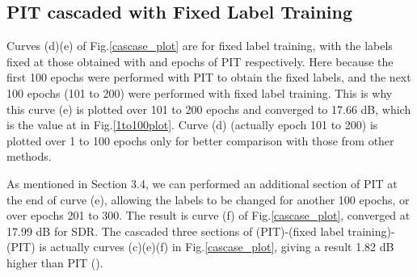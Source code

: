 \documentclass{article}
\begin{document}
\begin{figure*}[t]
    \vspace{-10pt}
    \centering
    \captionsetup{justification=centering}
    \caption{\small SDR scores on the validation set at each epoch for different training approaches:\\ (a)(b)(d)(e) fixed labels, (c)(f) dynamic labels (PIT), (e)(f) cascaded 2 and 3 sections.}
    \vspace{-7pt}
    \label{cascase_plot}
\end{figure*}


\subsection{PIT cascaded with Fixed Label Training }
\vspace{-7pt}
Curves (d)(e) of Fig.\ref{cascase_plot} are for fixed label training, with the labels fixed at those obtained with  and  epochs of PIT respectively. Here because the first 100 epochs were performed with PIT to obtain the fixed labels, and the next 100 epochs (101 to 200) were performed with fixed label training. This is why this curve (e) is plotted over 101 to 200 epochs and converged to 17.66 dB, which is the value at  in Fig.\ref{1to100plot}. Curve (d) (actually epoch 101 to 200) is plotted over 1 to 100 epochs only for better comparison with those from other methods. 



As mentioned in Section 3.4, we can performed an additional section of PIT at the end of curve (e), allowing the labels to be changed for another 100 epochs, or over epochs 201 to 300. The result is curve (f) of Fig.\ref{cascase_plot}, converged at 17.99 dB for SDR. The cascaded three sections of (PIT)-(fixed label training)-(PIT) is actually curves (c)(e)(f) in Fig.\ref{cascase_plot}, giving a result 1.82 dB higher than PIT ().
\end{document}

